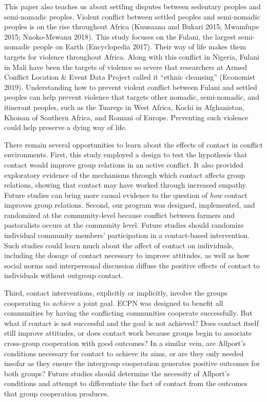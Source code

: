 \documentclass[11pt]{article}
\begin{document}
This paper also teaches us about settling disputes between sedentary
peoples and semi-nomadic peoples. Violent conflict between settled
peoples and semi-nomadic peoples is on the rise throughout Africa
(Kuusaana and Bukari 2015; Mwamfupe 2015; Nnoko-Mewanu 2018). This study
focuses on the Fulani, the largest semi-nomadic people on Earth
(Encyclopedia 2017). Their way of life makes them targets for violence
throughout Africa. Along with this conflict in Nigeria, Fulani in Mali
have been the targets of violence so severe that researchers at Armed
Conflict Location \& Event Data Project called it ``ethnic cleansing''
(Economist 2019). Understanding how to prevent violent conflict between
Fulani and settled peoples can help prevent violence that targets other
nomadic, semi-nomadic, and itinerant peoples, such as the Tuaregs in
West Africa, Kochi in Afghanistan, Khoisan of Southern Africa, and
Romani of Europe. Preventing such violence could help preserve a dying
way of life.

There remain several opportunities to learn about the effects of contact
in conflict environments. First, this study employed a design to test
the hypothesis that contact would improve group relations in an active
conflict. It also provided exploratory evidence of the mechanisms
through which contact affects group relations, showing that contact may
have worked through increased empathy. Future studies can bring more
causal evidence to the question of \emph{how} contact improves group
relations. Second, our program was designed, implemented, and randomized
at the community-level because conflict between farmers and pastoralists
occurs at the community level. Future studies should randomize
individual community members' participation in a contact-based
intervention. Such studies could learn much about the affect of contact
on individuals, including the dosage of contact necessary to improve
attitudes, as well as how social norms and interpersonal discussion
diffuse the positive effects of contact to individuals without outgroup
contact.

Third, contact interventions, explicitly or implicitly, involve the
groups cooperating to \emph{achieve} a joint goal. ECPN was designed to
benefit all communities by having the conflicting communities cooperate
successfully. But what if contact is not successful and the goal is not
achieved? Does contact itself still improve attitudes, or does contact
work because groups begin to associate cross-group cooperation with good
outcomes? In a similar vein, are Allport's conditions necessary for
contact to achieve its aims, or are they only needed insofar as they
ensure the intergroup cooperation generates positive outcomes for both
groups? Future studies should determine the necessity of Allport's
conditions and attempt to differentiate the fact of contact from the
outcomes that group cooperation produces.
\end{document}
